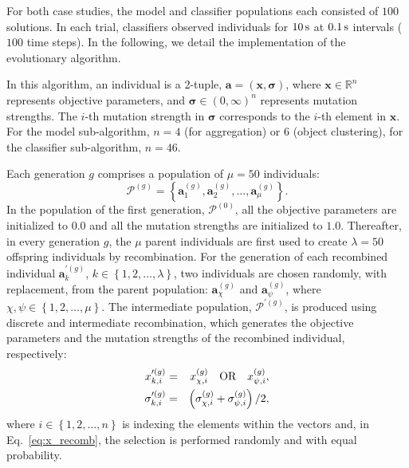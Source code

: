 For both case studies, the model and classifier populations each consisted of $100$ solutions. In each trial, classifiers observed individuals for $\unit[10]{s}$ at $\unit[0.1]{s}$ intervals ($100$ time steps). In the following, we detail the implementation of the evolutionary algorithm.

In this algorithm, an individual is a 2-tuple,
$\mathbf{a}=\left(\mathbf{x},\boldsymbol{\sigma}\right)$, where $\mathbf{x\in\mathbb{R}}^n$ represents objective parameters, and $\boldsymbol{\sigma}\in \left(0,\infty\right)^n$
represents mutation strengths. The $i$-th mutation strength in $\boldsymbol{\sigma}$ corresponds to the $i$-th element in $\mathbf{x}$. For the model sub-algorithm, $n=4$ (for aggregation) or $6$ (object clustering), for the classifier sub-algorithm, $n=46$.

Each generation $g$ comprises a population of $\mu=50$ individuals:
\begin{displaymath}
\mathcal{P}^{\left(g\right)} = \left\{\mathbf{a}_1^{\left(g\right)}, 
\mathbf{a}_2^{\left(g\right)},\dots,\mathbf{a}_{\mu}^{\left(g\right)}\right\}.
\end{displaymath}
In the population of the first generation, $\mathcal{P}^{\left(0\right)}$, all the objective parameters are initialized to $0.0$ and all the mutation strengths are initialized to $1.0$. Thereafter, in every generation $g$, the $\mu$ parent individuals are first used to create $\lambda=50$ offspring individuals by recombination. For the generation of each recombined individual $\mathbf{a}^{\prime\left(g\right)}_k$, $k\in\left\{1,2,\dots,\lambda\right\}$, two individuals are chosen randomly, with replacement, from the parent population: $\mathbf{a}^{\left(g\right)}_{\chi}$ and $\mathbf{a}^{\left(g\right)}_{\psi}$, where $\chi,\psi\in\left\{1,2,\dots,\mu\right\}$. The intermediate population,  $\mathcal{P}^{\prime \left(g\right)}$, is produced using discrete and intermediate recombination, which generates the objective parameters and the mutation strengths of the recombined individual, respectively:
\begin{eqnarray}
x_{k,i}^{\prime\left(g\right)} & = & x_{\chi,i}^{\left(g\right)} \textrm{\quad OR\quad} x_{\psi,i}^{\left(g\right)},\label{eq:x_recomb}\\
\sigma_{k,i}^{\prime\left(g\right)} & = & \left(\sigma_{\chi,i}^{\left(g\right)} + \sigma_{\psi,i}^{\left(g\right)}\right)/2,
\end{eqnarray}
where $i\in\left\{1,2,\dots,n\right\}$ is indexing the elements within the vectors and, in Eq.~\ref{eq:x_recomb}, the selection is performed randomly and with equal probability.

